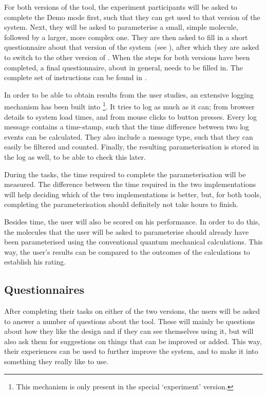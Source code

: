 For both versions of the tool, the experiment participants will be asked to complete the Demo mode first, such that they can get used to that version of the system. Next, they will be asked to parameterise a small, simple molecule, followed by a larger, more complex one. They are then asked to fill in a short questionnaire about that version of the system~(see ), after which they are asked to switch to the other version of \oframp. When the steps for both versions have been completed, a final questionnaire, about \oframp{} in general, needs to be filled in. The complete set of instructions can be found in .

In order to be able to obtain results from the user studies, an extensive logging mechanism has been built into \oframp\footnote{This mechanism is only present in the special `experiment' version.}. It tries to log as much as it can; from browser details to system load times, and from mouse clicks to button presses. Every log message contains a time-stamp, such that the time difference between two log events can be calculated. They also include a message type, such that they can easily be filtered and counted. Finally, the resulting parameterisation is stored in the log as well, to be able to check this later.

During the tasks, the time required to complete the parameterisation will be measured. The difference between the time required in the two implementations will help deciding which of the two implementations is better, but, for both tools, completing the parameterisation should definitely not take hours to finish.

Besides time, the user will also be scored on his performance. In order to do this, the molecules that the user will be asked to parameterise should already have been parameterised using the conventional quantum mechanical calculations. This way, the user's results can be compared to the outcomes of the calculations to establish his rating.


\subsection{Questionnaires}
After completing their tasks on either of the two versions, the users will be asked to answer a number of questions about the tool. These will mainly be questions about how they like the design and if they can see themselves using it, but will also ask them for suggestions on things that can be improved or added. This way, their experiences can be used to further improve the system, and to make it into something they really like to use.

